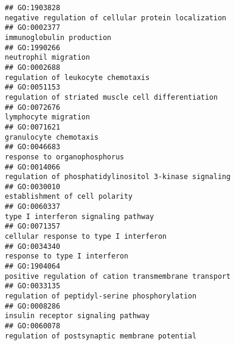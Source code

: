 \documentclass[
]{article}
\begin{document}
\begin{verbatim}
## GO:1903828                                                                                             negative regulation of cellular protein localization
## GO:0002377                                                                                                                        immunoglobulin production
## GO:1990266                                                                                                                             neutrophil migration
## GO:0002688                                                                                                               regulation of leukocyte chemotaxis
## GO:0051153                                                                                               regulation of striated muscle cell differentiation
## GO:0072676                                                                                                                             lymphocyte migration
## GO:0071621                                                                                                                           granulocyte chemotaxis
## GO:0046683                                                                                                                     response to organophosphorus
## GO:0014066                                                                                            regulation of phosphatidylinositol 3-kinase signaling
## GO:0030010                                                                                                                   establishment of cell polarity
## GO:0060337                                                                                                              type I interferon signaling pathway
## GO:0071357                                                                                                           cellular response to type I interferon
## GO:0034340                                                                                                                    response to type I interferon
## GO:1904064                                                                                            positive regulation of cation transmembrane transport
## GO:0033135                                                                                                    regulation of peptidyl-serine phosphorylation
## GO:0008286                                                                                                               insulin receptor signaling pathway
## GO:0060078                                                                                                    regulation of postsynaptic membrane potential

\end{verbatim}
\end{document}
